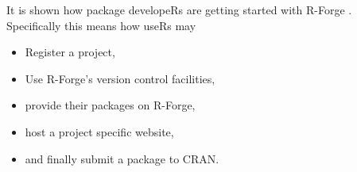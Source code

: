 \documentclass[12pt,a4paper]{article}
\begin{document}
It is shown how package developeRs are getting started with R-Forge
. Specifically this means how useRs may

\begin{itemize}
\item Register a project, 
\item Use R-Forge's version control facilities,
\item provide their packages on R-Forge,
\item host a project specific website,
\item and finally submit a package to CRAN.
\end{itemize}





\end{document}
